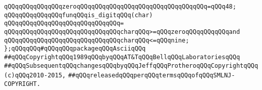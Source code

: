 \verb|qQQqqQQqqQQqqQQqzeroqQQqqQQqqQQqqQQqqQQqqQQqqQQqqQQqqQQq=qQQq48;|\newline
\newline
\verb|qQQqqQQqqQQqqQQqfunqQQqis_digitqQQq(char)|\newline
\verb|qQQqqQQqqQQqqQQqqQQqqQQqqQQqqQQq=|\newline
\verb|qQQqqQQqqQQqqQQqqQQqqQQqqQQqqQQqcharqQQq>=qQQqzeroqQQqqQQqqQQqand|\newline
\verb|qQQqqQQqqQQqqQQqqQQqqQQqqQQqqQQqcharqQQq<=qQQqnine;|\newline
\newline
\verb|};qQQqqQQq#qQQqqQQqpackageqQQqAsciiqQQq|\newline
\newline
\newline
\verb|##qQQqCopyrightqQQq1989qQQqbyqQQqAT&TqQQqBellqQQqLaboratoriesqQQq|\newline
\verb|##qQQqSubsequentqQQqchangesqQQqbyqQQqJeffqQQqProtheroqQQqCopyrightqQQq(c)qQQq2010-2015,|\newline
\verb|##qQQqreleasedqQQqperqQQqtermsqQQqofqQQqSMLNJ-COPYRIGHT.|\newline

